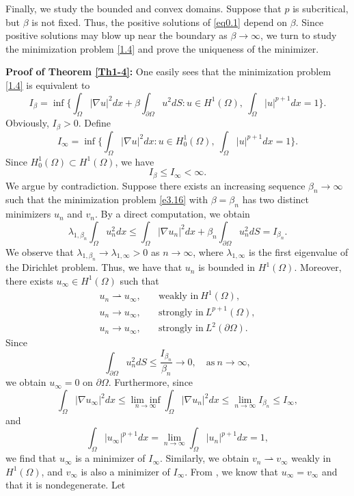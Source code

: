 \documentclass[12pt,reqno]{amsart}
\numberwithin{equation}{section}
\theoremstyle{definition}
\begin{document}
Finally, we study the bounded and convex domains. Suppose that $p$ is subcritical, but $\beta$ is not fixed. Thus, the positive solutions of \eqref{eq0.1} depend on $\beta$. Since positive solutions may blow up near the boundary as $\beta\to\infty$, we turn to study the minimization problem \eqref{1.4} and prove the uniqueness of the minimizer. 

 

{\bf Proof of Theorem \ref{Th1-4}:} One easily sees that the minimization problem \eqref{1.4} is equivalent to 
\begin{equation}\label{e3.16}
I_\beta=\inf \Big\{ \int_{\Omega}|\nabla u|^2dx+\beta\int_{\partial\Omega}u^2dS :  u\in H^1(\Omega), \ \int_{\Omega}|u|^{p+1}dx=1 \Big\}.
\end{equation}
Obviously, $I_\beta>0$. Define 
$$
I_\infty=\inf \Big\{ \int_{\Omega}|\nabla u|^2dx :  u\in H_0^1(\Omega), \ \int_{\Omega}|u|^{p+1}dx=1 \Big\}.
$$
Since $H_0^1(\Omega)\subset H^1(\Omega)$, we have 
$$
I_\beta\le I_\infty<\infty.
$$
We argue by contradiction. Suppose there exists an increasing sequence $\beta_n\to\infty$ such that the minimization  problem \eqref{e3.16} with $\beta=\beta_n$ has two distinct minimizers $u_n$ and $v_n$. By a direct computation, we obtain 
$$
\lambda_{1,\beta_n}\int_{\Omega}u_n^2dx\le\int_{\Omega}|\nabla u_n|^2dx+\beta_n\int_{\partial\Omega}u_n^2dS=I_{\beta_n}.
$$
We observe that $\lambda_{1,\beta_n}\to \lambda_{1,\infty}>0$ as $n\to\infty$, where $\lambda_{1,\infty}$ is the first eigenvalue of the Dirichlet problem. Thus, we have that $u_n$ is bounded in $H^1(\Omega)$. Moreover, there exists $u_\infty\in H^1(\Omega)$ such that 
\begin{align*}
u_n\rightharpoonup u_\infty,\quad &\text{weakly in}\ H^1(\Omega),\\
u_n\to u_\infty,\quad &\text{strongly in}\ L^{p+1}(\Omega),\\
u_n\to u_\infty,\quad &\text{strongly in}\ L^{2}(\partial\Omega).
\end{align*}
Since 
$$
\int_{\partial\Omega}u_n^2dS\le \frac{I_{\beta_n}}{\beta_n}\to 0,\quad \text{as}\ n\to\infty,
$$
we obtain $u_\infty=0$ on $\partial\Omega$. Furthermore, since 
$$
\int_{\Omega}|\nabla u_\infty|^2dx\le \underset{n\to\infty} {\lim\inf}\int_{\Omega}|\nabla u_n|^2dx\le \lim_{n\to\infty} I_{\beta_n}\le  I_\infty,
$$
and
$$
\int_{\Omega}|u_\infty|^{p+1}dx=\lim_{n\to\infty}\int_{\Omega}|u_n|^{p+1}dx=1,
$$
we find that $u_\infty$ is a minimizer of $I_\infty$. Similarly, we obtain $v_n \rightharpoonup v_\infty$ weakly in $H^1(\Omega)$, and $v_\infty$ is also a minimizer of $I_\infty$. From \cite{L}, we know that $u_\infty=v_\infty$ and that it is nondegenerate. Let 
\end{document}
